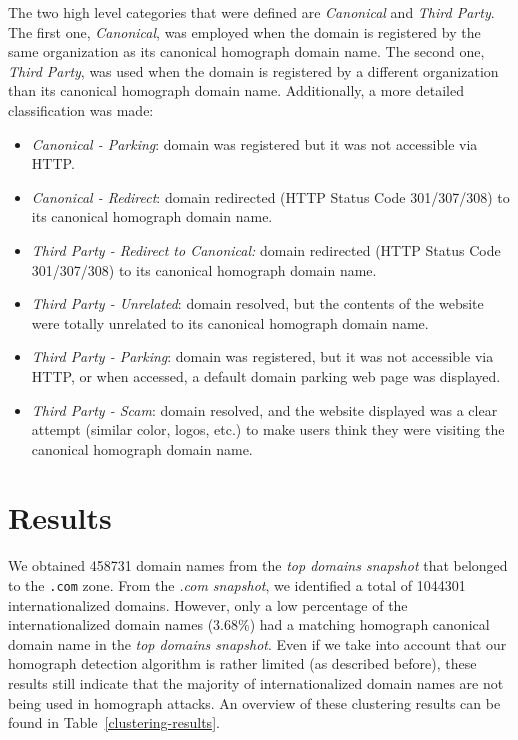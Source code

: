 \documentclass[letterpaper,twocolumn,10pt]{article}
\begin{document}
The two high level categories that were defined are \textit{Canonical} and \textit{Third Party}.
The first one, \textit{Canonical}, was employed when the domain is registered by the same organization as its canonical homograph domain name.
The second one, \textit{Third Party}, was used when the domain is registered by a different organization than its canonical homograph domain name.
Additionally, a more detailed classification was made:
\begin{itemize}
\setlength{\itemsep}{0pt}
\setlength{\parskip}{0pt}
\setlength{\parsep}{0pt}
\item \textit{Canonical - Parking}: domain was registered but it was not accessible via HTTP.
\item \textit{Canonical - Redirect}: domain redirected (HTTP Status Code 301/307/308) to its canonical homograph domain name.
\item \textit{Third Party - Redirect to Canonical:} domain redirected (HTTP Status Code 301/307/308) to its canonical homograph domain name.
\item \textit{Third Party - Unrelated}: domain resolved, but the contents of the website were totally unrelated to its canonical homograph domain name.
\item \textit{Third Party - Parking}: domain was registered, but it was not accessible via HTTP, or when accessed, a default domain parking web page was displayed.
\item \textit{Third Party - Scam}: domain resolved, and the website displayed was a clear attempt (similar color, logos, etc.) to make users think they were visiting the canonical homograph domain name.
\end{itemize}

\section{Results}
We obtained 458731 domain names from the \textit{top domains snapshot} that belonged to the \texttt{.com} zone.
From the \textit{.com snapshot}, we identified a total of 1044301 internationalized domains.
However, only a low percentage of the internationalized domain names (3.68\%) had a matching homograph canonical domain name in the \textit{top domains snapshot}.
Even if we take into account that our homograph detection algorithm is rather limited (as described before), these results still indicate that the majority of internationalized domain names are not being used in homograph attacks.
An overview of these clustering results can be found in Table~\ref{clustering-results}.
\end{document}
